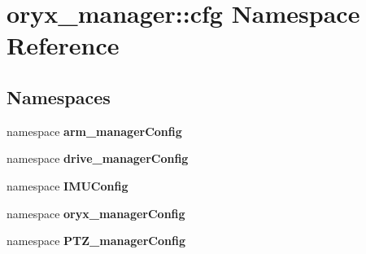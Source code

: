 \section{oryx\-\_\-manager\-:\-:cfg \-Namespace \-Reference}
\label{namespaceoryx__manager_1_1cfg}
\subsection*{\-Namespaces}
\begin{DoxyCompactItemize}
\item 
namespace {\bf arm\-\_\-manager\-Config}
\item 
namespace {\bf drive\-\_\-manager\-Config}
\item 
namespace {\bf \-I\-M\-U\-Config}
\item 
namespace {\bf oryx\-\_\-manager\-Config}
\item 
namespace {\bf \-P\-T\-Z\-\_\-manager\-Config}
\end{DoxyCompactItemize}
